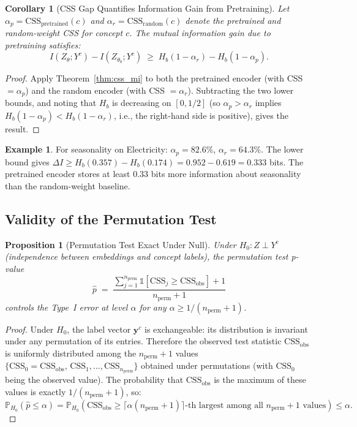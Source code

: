 \documentclass[12pt]{article}
\newtheorem{proposition}[theorem]{Proposition}
\newtheorem{corollary}[theorem]{Corollary}
\theoremstyle{definition}
\newtheorem{example}[theorem]{Example}
\theoremstyle{remark}
\newcommand{\Prob}{\mathbb{P}}
\newcommand{\ind}[1]{\mathbb{1}\!\left[#1\right]}
\newcommand{\css}{\mathrm{CSS}}
\newcommand{\Hb}{H_b}
\begin{document}
\begin{corollary}[CSS Gap Quantifies Information Gain from Pretraining]
\label{cor:css_gap}
Let $\alpha_p = \css_{\mathrm{pretrained}}(c)$ and
$\alpha_r = \css_{\mathrm{random}}(c)$ denote the pretrained and
random-weight CSS for concept $c$. The mutual information gain due to
pretraining satisfies:
\[
  I(Z_\theta; Y^c) - I(Z_{\theta_0}; Y^c)
  \;\geq\; \Hb(1-\alpha_r) - \Hb(1-\alpha_p).
\]
\end{corollary}

\begin{proof}
Apply Theorem~\ref{thm:css_mi} to both the pretrained encoder
(with CSS $= \alpha_p$) and the random encoder (with CSS $= \alpha_r$).
Subtracting the two lower bounds, and noting that $\Hb$ is
decreasing on $[0, 1/2]$ (so $\alpha_p > \alpha_r$ implies
$\Hb(1-\alpha_p) < \Hb(1-\alpha_r)$, i.e., the right-hand side is positive),
gives the result.
\end{proof}

\begin{example}
For seasonality on Electricity: $\alpha_p = 82.6\%$, $\alpha_r = 64.3\%$.
The lower bound gives $\Delta I \geq \Hb(0.357) - \Hb(0.174)
= 0.952 - 0.619 = 0.333$ bits.
The pretrained encoder stores at least $0.33$ bits more information about
seasonality than the random-weight baseline.
\end{example}

\subsection{Validity of the Permutation Test}

\begin{proposition}[Permutation Test Exact Under Null]
\label{prop:permtest}
Under $H_0 : Z \perp Y^c$ (independence between embeddings and concept
labels), the permutation test p-value
\[
  \hat{p} \;=\; \frac{\sum_{j=1}^{n_\mathrm{perm}} \ind{\css_j \geq \css_{\mathrm{obs}}} + 1}{n_\mathrm{perm} + 1}
\]
controls the Type~I error at level $\alpha$ for any
$\alpha \geq 1/(n_\mathrm{perm} + 1)$.
\end{proposition}

\begin{proof}
Under $H_0$, the label vector $\mathbf{y}^c$ is exchangeable: its
distribution is invariant under any permutation of its entries. Therefore
the observed test statistic $\css_{\mathrm{obs}}$ is uniformly distributed
among the $n_\mathrm{perm} + 1$ values
$\{\css_0 = \css_{\mathrm{obs}},\, \css_1,\ldots,\css_{n_\mathrm{perm}}\}$
obtained under permutations (with $\css_0$ being the observed value). The
probability that $\css_{\mathrm{obs}}$ is the maximum of these values is
exactly $1/(n_\mathrm{perm}+1)$, so:
\[
  \Prob_{H_0}(\hat{p} \leq \alpha)
  = \Prob_{H_0}\!\left(\css_{\mathrm{obs}} \geq \lceil\alpha(n_\mathrm{perm}+1)\rceil
    \text{-th largest among all } n_\mathrm{perm}+1 \text{ values}\right) \leq \alpha.
\]
\end{proof}
\end{document}
